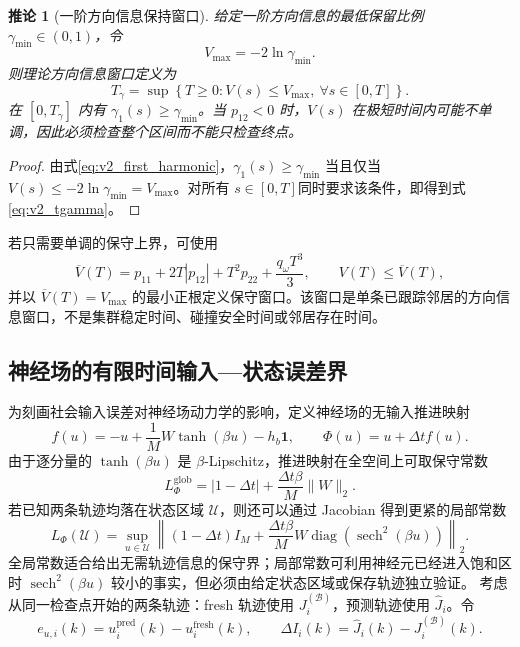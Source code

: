 \documentclass[UTF8,fontset=windows,11pt]{ctexart}
\newtheorem{corollary}[theorem]{推论}
\begin{document}
\begin{corollary}[一阶方向信息保持窗口]
\label{cor:v2_direction_window}
给定一阶方向信息的最低保留比例 $\gamma_{\min}\in(0,1)$，令
\begin{equation}
 V_{\max}=-2\ln\gamma_{\min}.
 \label{eq:v2_vmax}
\end{equation}
则理论方向信息窗口定义为
\begin{equation}
 T_\gamma=\sup\left\{T\ge0:
 V(s)\le V_{\max},\ \forall s\in[0,T]\right\}.
 \label{eq:v2_tgamma}
\end{equation}
在 $[0,T_\gamma]$ 内有 $\gamma_1(s)\ge\gamma_{\min}$。当 $p_{12}<0$ 时，$V(s)$ 在极短时间内可能不单调，因此必须检查整个区间而不能只检查终点。
\end{corollary}

\begin{proof}
由式\eqref{eq:v2_first_harmonic}，$\gamma_1(s)\ge\gamma_{\min}$ 当且仅当 $V(s)\le-2\ln\gamma_{\min}=V_{\max}$。对所有 $s\in[0,T]$同时要求该条件，即得到式\eqref{eq:v2_tgamma}。
\end{proof}

若只需要单调的保守上界，可使用
\begin{equation}
 \overline V(T)=p_{11}+2T|p_{12}|+T^2p_{22}+\frac{q_\omega T^3}{3},
 \qquad V(T)\le\overline V(T),
 \label{eq:v2_vupper}
\end{equation}
并以 $\overline V(T)=V_{\max}$ 的最小正根定义保守窗口。该窗口是单条已跟踪邻居的方向信息窗口，不是集群稳定时间、碰撞安全时间或邻居存在时间。

\subsection{神经场的有限时间输入—状态误差界}

为刻画社会输入误差对神经场动力学的影响，定义神经场的无输入推进映射
\begin{equation}
 f(u)=-u+\frac{1}{M}W\tanh(\beta u)-h_b\bm 1,
 \qquad
 \Phi(u)=u+\Delta t f(u).
 \label{eq:v2_field_map}
\end{equation}
由于逐分量的 $\tanh(\beta u)$ 是 $\beta$-Lipschitz，推进映射在全空间上可取保守常数
\begin{equation}
 L_\Phi^{\mathrm{glob}}
 =|1-\Delta t|+\frac{\Delta t\beta}{M}\|W\|_2.
 \label{eq:v2_global_lipschitz}
\end{equation}
若已知两条轨迹均落在状态区域 $\mathcal U$，则还可以通过 Jacobian 得到更紧的局部常数
\begin{equation}
 L_\Phi(\mathcal U)=
 \sup_{u\in\mathcal U}
 \left\|(1-\Delta t)I_M+
 \frac{\Delta t\beta}{M}W
 \operatorname{diag}\!\left(\operatorname{sech}^2(\beta u)\right)
 \right\|_2.
 \label{eq:v2_local_lipschitz}
\end{equation}
全局常数适合给出无需轨迹信息的保守界；局部常数可利用神经元已经进入饱和区时 $\operatorname{sech}^2(\beta u)$ 较小的事实，但必须由给定状态区域或保存轨迹独立验证。
考虑从同一检查点开始的两条轨迹：fresh 轨迹使用 $J_i^{(\mathcal B)}$，预测轨迹使用 $\widehat J_i$。令
\begin{equation}
 e_{u,i}(k)=u_i^{\mathrm{pred}}(k)-u_i^{\mathrm{fresh}}(k),
 \qquad
 \Delta I_i(k)=\widehat J_i(k)-J_i^{(\mathcal B)}(k).
 \label{eq:v2_state_error}
\end{equation}
\end{document}
